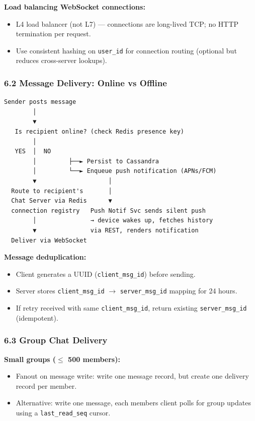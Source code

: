 \documentclass[11pt]{article}
\providecommand{\tightlist}{\setlength{\itemsep}{1pt}\setlength{\parskip}{0pt}}
\begin{document}
\textbf{Load balancing WebSocket connections:}

\begin{itemize}
\tightlist
\item
  L4 load balancer (not L7) --- connections are long-lived TCP; no HTTP termination per request.
\item
  Use consistent hashing on \texttt{user\_id} for connection routing (optional but reduces cross-server lookups).
\end{itemize}

\subsubsection{6.2 Message Delivery: Online vs Offline}\label{62-message-delivery-online-vs-offline}

\setcodelang{}

\begin{verbatim}
Sender posts message
        │
        ▼
   Is recipient online? (check Redis presence key)
        │
   YES  │  NO
        │         ├──► Persist to Cassandra
        │         └──► Enqueue push notification (APNs/FCM)
        ▼                    │
  Route to recipient's       │
  Chat Server via Redis      ▼
  connection registry   Push Notif Svc sends silent push
        │               → device wakes up, fetches history
        ▼               via REST, renders notification
  Deliver via WebSocket
\end{verbatim}

\textbf{Message deduplication:}

\begin{itemize}
\tightlist
\item
  Client generates a UUID (\texttt{client\_msg\_id}) before sending.
\item
  Server stores \texttt{client\_msg\_id} \(\rightarrow\) \texttt{server\_msg\_id} mapping for 24 hours.
\item
  If retry received with same \texttt{client\_msg\_id}, return existing \texttt{server\_msg\_id} (idempotent).
\end{itemize}

\subsubsection{6.3 Group Chat Delivery}\label{63-group-chat-delivery}

\textbf{Small groups (\(\leq\) 500 members):}

\begin{itemize}
\tightlist
\item
  Fanout on message write: write one message record, but create one delivery record per member.
\item
  Alternative: write one message, each member\textquotesingle s client polls for group updates using a \texttt{last\_read\_seq} cursor.
\end{itemize}
\end{document}
